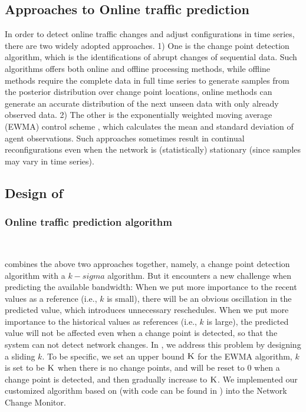 {\subsection{Approaches to Online traffic prediction}
\label{subsec:dynamic:prediction}
In order to detect online traffic changes and adjust configurations in time series, there are two widely adopted approaches. 1) One is the change point detection algorithm, which is the identifications of abrupt changes of sequential data. Such algorithms offers both online and offline processing methods, while offline methods \cite{smith1975bayesian,stephens1994bayesian,barry1993bayesian,green1995reversible} require the complete data in full time series to generate samples from the posterior distribution over change point locations, online methods \cite{page1955test,desobry2005online,lorden1971procedures} can generate an accurate distribution of the next unseen data with only already observed data. 2) The other is the exponentially weighted moving average (EWMA) control scheme \cite{roberts1959control,lucas1990exponentially}, which calculates the mean and standard deviation of agent observations. Such approaches sometimes result in continual reconfigurations even when the network is (statistically) stationary (since samples may vary in time series).

\subsection{Design of \newname}
\subsubsection{Online traffic prediction algorithm}
\ 

\newname combines the above two approaches together, namely, a change point detection algorithm \cite{adams2007bayesian} with a $k-sigma$ algorithm. But it encounters a new challenge when predicting the available bandwidth: When we put more importance to the recent values as a reference (i.e., $k$ is small), there will be an obvious oscillation in the predicted value, which introduces unnecessary reschedules. When we put more importance to the historical values as references (i.e., $k$ is large), the predicted value will not be affected even when a change point is detected, so that the system can not detect network changes. In \newname, we address this problem by designing a sliding $k$. To be specific, we set an upper bound $\textsc{K}$ for the EWMA algorithm, $k$ is set to be $\textsc{K}$ when there is no change points, and will be reset to $0$ when a change point is detected, and then gradually increase to $\textsc{K}$. We implemented our customized algorithm based on \cite{adams2007bayesian} (with code can be found in \cite{BOCDcode}) into the Network Change Monitor.

}
